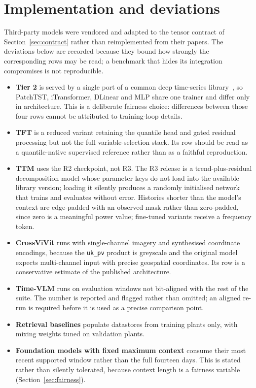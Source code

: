 \section{Implementation and deviations}
\label{sec:implementation}

Third-party models were vendored and adapted to the tensor contract of
Section~\ref{sec:contract} rather than reimplemented from their papers. The deviations
below are recorded because they bound how strongly the corresponding rows may be read; a
benchmark that hides its integration compromises is not reproducible.

\begin{itemize}
  \item \textbf{Tier 2} is served by a single port of a common deep time-series
    library~\cite{tslib}, so PatchTST, iTransformer, DLinear and MLP share one trainer and
    differ only in architecture. This is a deliberate fairness choice: differences between
    those four rows cannot be attributed to training-loop details.
  \item \textbf{TFT} is a reduced variant retaining the quantile head and gated residual
    processing but not the full variable-selection stack. Its row should be read as a
    quantile-native supervised reference rather than as a faithful reproduction.
  \item \textbf{TTM} uses the R2 checkpoint, not R3. The R3 release is a trend-plus-residual
    decomposition model whose parameter keys do not load into the available library version;
    loading it silently produces a randomly initialised network that trains and evaluates
    without error. Histories shorter than the model's context are edge-padded with an
    observed mask rather than zero-padded, since zero is a meaningful power value; fine-tuned
    variants receive a frequency token.
  \item \textbf{CrossViVit} runs with single-channel imagery and synthesised coordinate
    encodings, because the \texttt{uk\_pv} product is greyscale and the original model expects
    multi-channel input with precise geospatial coordinates. Its row is a conservative
    estimate of the published architecture.
  \item \textbf{Time-VLM} runs on evaluation windows not bit-aligned with the rest of the
    suite. The number is reported and flagged rather than omitted; an aligned re-run is
    required before it is used as a precise comparison point.
  \item \textbf{Retrieval baselines} populate datastores from training plants only, with
    mixing weights tuned on validation plants.
  \item \textbf{Foundation models with fixed maximum context} consume their most recent
    supported window rather than the full fourteen days. This is stated rather than silently
    tolerated, because context length is a fairness variable
    (Section~\ref{sec:fairness}).
\end{itemize}

